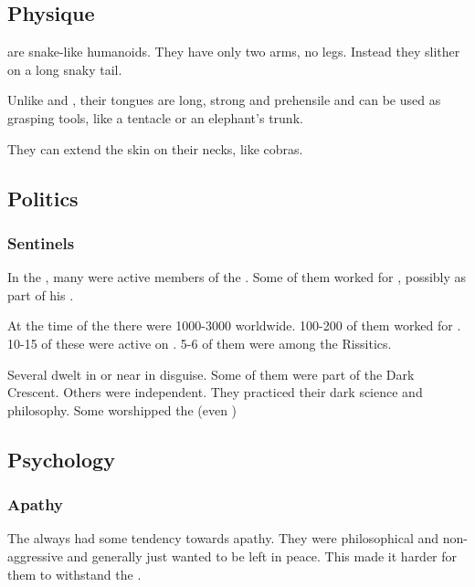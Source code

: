 \subsection{Physique}
\QuilJaaran{} are snake-like humanoids. 
They have only two arms, no legs.
Instead they slither on a long snaky tail. 

Unlike \dragons{} and \nagae, their tongues are long, strong and prehensile and can be used as grasping tools, like a tentacle or an elephant's trunk. 

They can extend the skin on their necks, like cobras. 









\subsection{Politics}





\subsubsection{Sentinels}
In the , many \quiljaaran were active members of the . 
Some of them worked for , possibly as part of his . 

At the time of the \thirdbanewar there were 1000-3000 \quiljaaran worldwide. 
100-200 of them worked for \Secherdamon.
10-15 of these were active on \Azmith.
5-6 of them were among the Rissitics. 

Several \quiljaaran dwelt in or near \Yormis in disguise. 
Some of them were part of the Dark Crescent.
Others were independent.
They practiced their dark science and philosophy. 
Some worshipped the \xs (even \Ubloth) 









\subsection{Psychology}





\subsubsection{Apathy}
The \quiljaaran{} always had some tendency towards apathy. 
They were philosophical and non-aggressive and generally just wanted to be left in peace. 
This made it harder for them to withstand the . 





